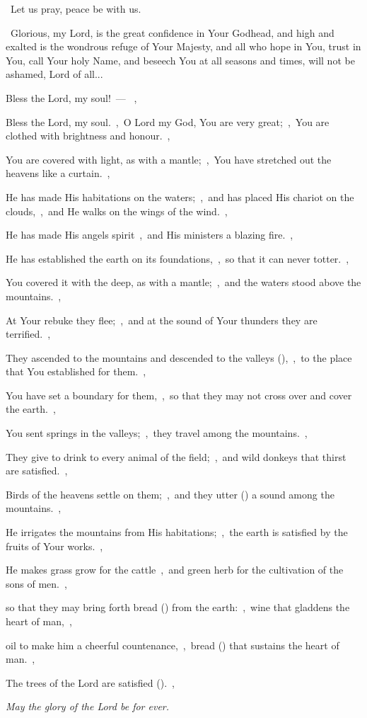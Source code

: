 \documentclass[12pt,twoside,a5paper]{article}
\begin{document}
\dd~Let us pray, peace be with us.

\cc~Glorious, my Lord, is the great confidence in Your Godhead, and high and exalted is the wondrous refuge of Your Majesty, and all who hope in You, trust in You, call Your holy Name, and beseech You at all seasons and times, will not be ashamed, Lord of all...

\begin{halfparskip}
   Bless the Lord, my soul!~--- ~\sep

  Bless the Lord, my soul.~\sep\ O Lord my God, You are very great;~\sep\ You are clothed with brightness and honour.~\sep

  You are covered with light, as with a mantle;~\sep\ You have stretched out the heavens like a curtain.~\sep

  He has made His habitations on the waters;~\sep\ and has placed His chariot on the clouds,~\sep\ and He walks on the wings of the wind.~\sep

  He has made His angels spirit~\sep\ and His ministers a blazing fire.~\sep

  He has established the earth on its foundations,~\sep\ so that it can never totter.~\sep

  You covered it with the deep, as with a mantle;~\sep\ and the waters stood above the mountains.~\sep

  At Your rebuke they flee;~\sep\ and at the sound of Your thunders they are terrified.~\sep

  They ascended to the mountains and descended to the valleys (),~\sep\ to the place that You established for them.~\sep

  You have set a boundary for them,~\sep\ so that they may not cross over and cover the earth.~\sep

  You sent springs in the valleys;~\sep\ they travel among the mountains.~\sep

  They give to drink to every animal of the field;~\sep\ and wild donkeys that thirst are satisfied.~\sep

  Birds of the heavens settle on them;~\sep\ and they utter () a sound among the mountains.~\sep

  He irrigates the mountains from His habitations;~\sep\ the earth is satisfied by the fruits of Your works.~\sep

  He makes grass grow for the cattle~\sep\ and green herb for the cultivation of the sons of men.~\sep

  so that they may bring forth bread () from the earth:~\sep\ wine that gladdens the heart of man,~\sep

  oil to make him a cheerful countenance,~\sep\ bread () that sustains the heart of man.~\sep

  The trees of the Lord are satisfied ().~\sep

   \emph{May the glory of the Lord be for ever.}
\end{halfparskip}
\end{document}
